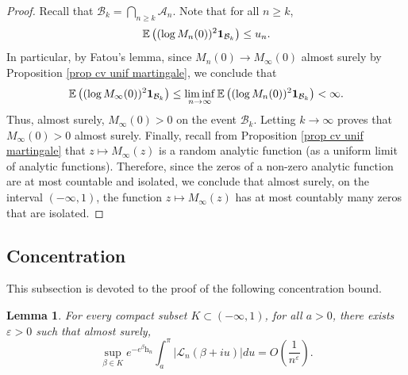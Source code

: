 \documentclass[11pt]{article}
\newtheorem{lemma}[theorem]{Lemma}
\numberwithin{equation}{section}
\def\vp{\varepsilon}
\def \cL{\mathcal{L}}
\def\E{\mathbb{E}}
\begin{document}
\begin{proof}
	Recall that $\mathcal{B}_k = \bigcap_{n\ge k} \mathcal{A}_n$. Note that for all $n\ge k$,
	\[
	\E\left((\log M_n(0))^2 {\bf 1}_{\mathcal{B}_k} \right)\le u_n.
	\]
	In particular, by Fatou's lemma, since $M_n(0)\to M_\infty(0)$ almost surely by Proposition \ref{prop cv unif martingale}, we conclude that
	\[
	\E\left((\log M_\infty(0))^2  {\bf 1}_{\mathcal{B}_k} \right) \le \liminf_{n\to \infty}\E\left((\log M_n(0))^2 {\bf 1}_{\mathcal{B}_k} \right) <\infty. 
	\]
	Thus, almost surely, $M_\infty(0) >0$ on the event $\mathcal{B}_k$. Letting $k\to \infty$ proves that $M_\infty(0)>0$ almost surely. Finally, recall from Proposition \ref{prop cv unif martingale} that $z\mapsto M_\infty(z)$ is a random analytic function (as a uniform limit of analytic functions). Therefore, since the zeros of a non-zero analytic function are at most countable and isolated, we conclude that almost surely, on the interval $(-\infty, 1)$, the function $z\mapsto M_\infty(z)$ has at most countably many zeros that are isolated.
\end{proof}
\subsection{Concentration}\label{sous-section concentration}
This subsection is devoted to the proof of the following concentration bound.
\begin{lemma}\label{lemme controle queue integrale}
	For every compact subset $K \subset (-\infty, 1)$, for all $a>0$, there exists $\vp>0$ such that almost surely,
	\[
	\sup_{\beta \in K} e^{-e^\beta \mathrm{h}_n} \int_a^\pi \left\vert \cL_n(\beta+iu) \right\vert du  = O\left(\frac{1}{n^\vp}\right).
	\]
\end{lemma}
\end{document}
